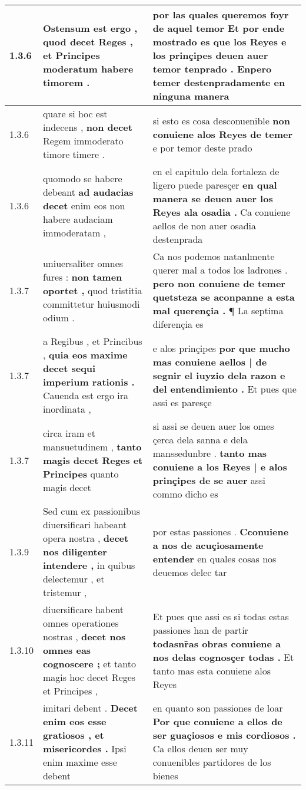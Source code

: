 \begin{tabular}{|p{1cm}|p{6.5cm}|p{6.5cm}|}
1.3.6 & Ostensum est ergo , \textbf{ quod decet Reges , } et Principes moderatum habere timorem . & por las quales queremos foyr de aquel temor \textbf{ Et por ende mostrado es que los Reyes e los prinçipes deuen auer temor tenprado . } Enpero temer destenpradamente en ninguna manera \\\hline
1.3.6 & quare si hoc est indecens , \textbf{ non decet } Regem immoderato timore timere . & si esto es cosa desconuenible \textbf{ non conuiene alos Reyes de temer } e por temor deste prado \\\hline
1.3.6 & quomodo se habere debeant \textbf{ ad audacias decet } enim eos non habere audaciam immoderatam , & en el capitulo dela fortaleza de ligero puede paresçer \textbf{ en qual manera se deuen auer los Reyes ala osadia . } Ca conuiene aellos de non auer osadia destenprada \\\hline
1.3.7 & uniuersaliter omnes fures : \textbf{ non tamen oportet , } quod tristitia committetur huiusmodi odium . & Ca nos podemos natanlmente querer mal a todos los ladrones . \textbf{ pero non conuiene de temer quetsteza se aconpanne a esta mal querençia . } ¶ La septima diferençia es \\\hline
1.3.7 & a Regibus , et Princibus , \textbf{ quia eos maxime decet sequi imperium rationis . } Cauenda est ergo ira inordinata , & e alos prinçipes \textbf{ por que mucho mas conuiene aellos | de segnir el iuyzio dela razon e del entendimiento . } Et pues que assi es paresçe \\\hline
1.3.7 & circa iram et mansuetudinem , \textbf{ tanto magis decet Reges et Principes } quanto magis decet & si assi se deuen auer los omes çerca dela sanna e dela manssedunbre . \textbf{ tanto mas conuiene a los Reyes | e alos prinçipes de se auer } assi commo dicho es \\\hline
1.3.9 & Sed cum ex passionibus diuersificari habeant opera nostra , \textbf{ decet nos diligenter intendere , } in quibus delectemur , et tristemur , & por estas passiones . \textbf{ Cconuiene a nos de acuçiosamente entender } en quales cosas nos deuemos delec tar \\\hline
1.3.10 & diuersificare habent omnes operationes nostras , \textbf{ decet nos omnes eas cognoscere ; } et tanto magis hoc decet Reges et Principes , & Et pues que assi es si todas estas passiones han de partir \textbf{ todasnr̃as obras conuiene a nos delas cognosçer todas . } Et tanto mas esta conuiene alos Reyes \\\hline
1.3.11 & imitari debent . \textbf{ Decet enim eos esse gratiosos , et misericordes . } Ipsi enim maxime esse debent & en quanto son passiones de loar \textbf{ Por que conuiene a ellos de ser guaçiosos e mis cordiosos . } Ca ellos deuen ser muy conuenibles partidores de los bienes \\\hline

\end{tabular}
